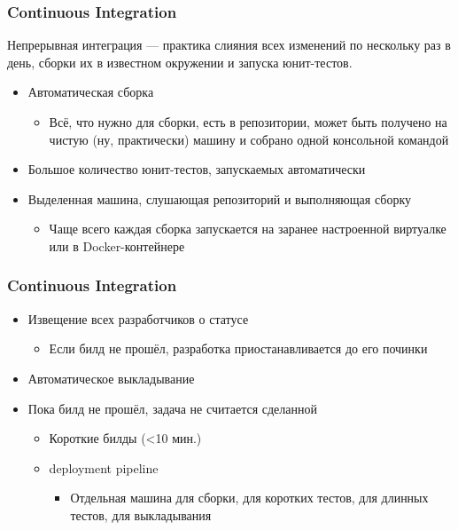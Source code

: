 \documentclass{../../slides-style}
\begin{document}
    \begin{frame}
        \frametitle{Continuous Integration}
        Непрерывная интеграция --- практика слияния всех изменений по нескольку раз в день, сборки их в известном окружении и запуска юнит-тестов.
        \begin{itemize}
            \item Автоматическая сборка
            \begin{itemize}
                \item Всё, что нужно для сборки, есть в репозитории, может быть получено на чистую (ну, практически) машину и собрано одной консольной командой
            \end{itemize}
            \item Большое количество юнит-тестов, запускаемых автоматически
            \item Выделенная машина, слушающая репозиторий и выполняющая сборку
            \begin{itemize}
                \item Чаще всего каждая сборка запускается на заранее настроенной виртуалке или в Docker-контейнере
            \end{itemize}
        \end{itemize}
    \end{frame}

    \begin{frame}
        \frametitle{Continuous Integration}
        \begin{itemize}
            \item Извещение всех разработчиков о статусе
            \begin{itemize}
                \item Если билд не прошёл, разработка приостанавливается до его починки
            \end{itemize}
            \item Автоматическое выкладывание
            \item Пока билд не прошёл, задача не считается сделанной
            \begin{itemize}
                \item Короткие билды (<10 мин.)
                \item deployment pipeline
                \begin{itemize}
                    \item Отдельная машина для сборки, для коротких тестов, для длинных тестов, для выкладывания
                \end{itemize}
            \end{itemize}
        \end{itemize}
    \end{frame}
\end{document}
